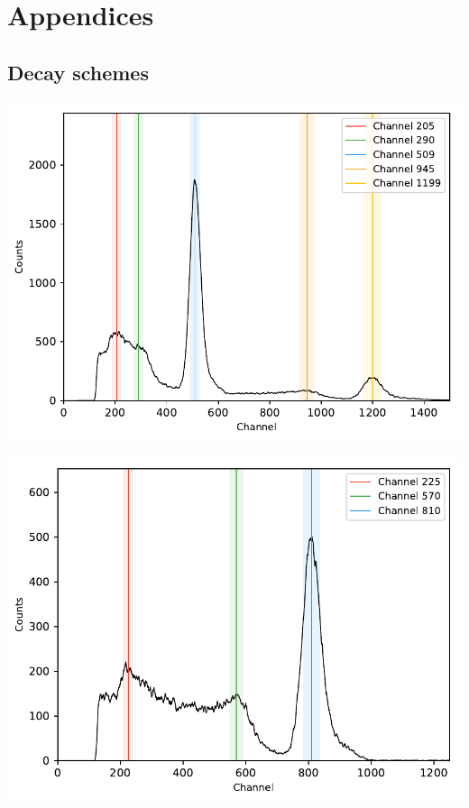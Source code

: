 \section{Appendices}
%
\subsection{Decay schemes}
%
\begin{center}
    \begin{adjustbox}{max width=\linewidth, keepaspectratio}
        \includegraphics[]{pdf/22Na}
    \end{adjustbox}
    \label{fig:22NaDecayScheme}
\end{center}
%
\begin{center}
    \begin{adjustbox}{max width=\linewidth, keepaspectratio}
        \includegraphics[]{pdf/54Mn}
    \end{adjustbox}
    \label{fig:54MnDecayScheme}
\end{center}
